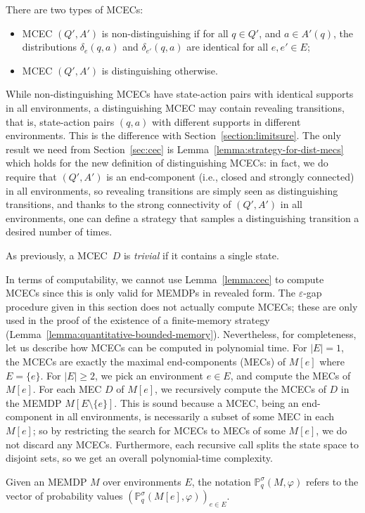 \documentclass[a4paper,USenglish,cleveref, autoref, thm-restate]{lipics-v2021}
\let\epsilon\varepsilon
\def\abs#1{\ensuremath{\lvert #1 \rvert}}
\newcommand*{\pr}{\mathbb{P}}
\begin{document}
There are two types of MCECs:
\begin{itemize}
  \item MCEC $(Q',A')$ is non-distinguishing if for all $q \in Q'$, and $a \in A'(q)$, the distributions $\delta_e(q,a)$ and $\delta_{e'}(q,a)$ are identical
  for all $e,e' \in E$;
  \item MCEC $(Q',A')$ is distinguishing otherwise.
\end{itemize}
While non-distinguishing MCECs have state-action pairs with identical supports in all environments,
a distinguishing MCEC may contain revealing transitions, that is, state-action pairs $(q,a)$ with different supports in different environments.
This is the difference with Section~\ref{section:limitsure}.
The only result we need from Section~\ref{sec:cec} is Lemma~\ref{lemma:strategy-for-dist-mecs} which holds for the new definition of distinguishing MCECs:
in fact, we do require that $(Q',A')$ is an end-component (i.e., closed and strongly connected) in all environments, 
so revealing transitions are simply seen as distinguishing transitions, and thanks to the strong connectivity of $(Q',A')$ in all environments, one can 
define a strategy that samples a distinguishing transition a desired number of times.

As previously, a MCEC~$D$ is \emph{trivial} if it contains a single state.


In terms of computability, we cannot use Lemma~\ref{lemma:cec} to compute MCECs since this is only valid for MEMDPs in revealed form.
The $\epsilon$-gap procedure given in this section does not actually compute MCECs; these are only used in the proof of the existence of a finite-memory strategy (Lemma~\ref{lemma:quantitative-bounded-memory}).
Nevertheless, for completeness, let us describe how MCECs can be computed in polynomial time.
For $\abs{E}=1$, the MCECs are exactly the maximal end-components (MECs) of $M[e]$ where $E=\{e\}$. For $\abs{E}\geq 2$, we pick an environment $e \in E$, and compute the MECs of $M[e]$.
For each MEC $D$ of $M[e]$, we recursively compute the MCECs of $D$ in the MEMDP $M[E\setminus\{e\}]$. 
This is sound because a MCEC, being an end-component in all environments, is necessarily a subset of some MEC in each $M[e]$; so by restricting the search for MCECs to MECs of some $M[e]$, we do not discard any MCECs.
Furthermore, each recursive call splits the state space to disjoint sets, so we get an overall polynomial-time complexity.

Given an MEMDP $M$ over environments $E$, the notation $\pr_q^\sigma(M, \varphi)$ 
refers to the vector of probability values $(\pr_q^\sigma(M[e], \varphi))_{e \in E}$.
\end{document}
